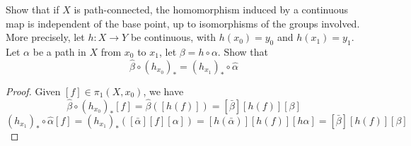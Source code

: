 \documentclass[12pt,a4paper]{article}
\begin{document}
    \begin{ex}
        Show that if $X$ is path-connected, the homomorphism induced by a continuous map is independent of the base point, up to isomorphisms of the groups involved. More precisely, let $h:X\to Y$ be continuous, with $h(x_0)=y_0$ and $h(x_1)=y_1$. Let $\alpha$ be a path in $X$ from $x_0$ to $x_1$, let $\beta=h\circ\alpha$. Show that 
        \[
            \hat{\beta}\circ(h_{x_0})_*=(h_{x_1})_*\circ\hat{\alpha}
        \]
    \end{ex}
    \begin{proof}
        Given $[f]\in\pi_1(X,x_0)$, we have
        \[
            \hat{\beta}\circ(h_{x_0})_*[f]=\hat{\beta}([h(f)])=[\bar{\beta}][h(f)][\beta]
        \]
        \[
            (h_{x_1})_*\circ\hat{\alpha}[f]=(h_{x_1})_*([\bar{\alpha}][f][\alpha])=[h(\bar{\alpha})][h(f)][h\alpha]=[\bar{\beta}][h(f)][\beta]
        \]
    \end{proof}
    \bigskip
\end{document}
